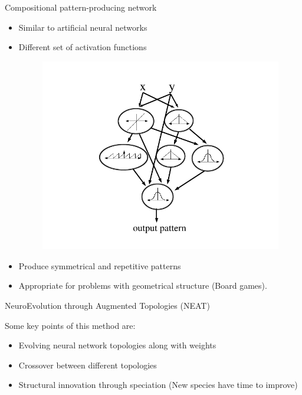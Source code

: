 \documentclass{beamer}
\begin{document}
\begin{frame}{Compositional pattern-producing network~\cite{stanley2007compositional}}
\begin{itemize}
\item Similar to artificial neural networks
\item Different set of activation functions
\begin{figure}
\begin{center}
\includegraphics[scale=0.25]{figures/cppnNetwork.png}
\end{center}
\end{figure}
\item Produce symmetrical and repetitive patterns
\item Appropriate for problems with geometrical structure (Board games).
\end{itemize}
\end{frame}


\begin{frame}{NeuroEvolution through Augmented Topologies (NEAT)~\cite{stanley2002evolving}}
\begin{block}{Some key points of this method are:}
\begin{itemize}
\item Evolving neural network topologies along with weights
\item Crossover between different topologies
\item Structural innovation through speciation (New species have time to improve)
\end{itemize}
\end{block}
\end{frame}
\end{document}
